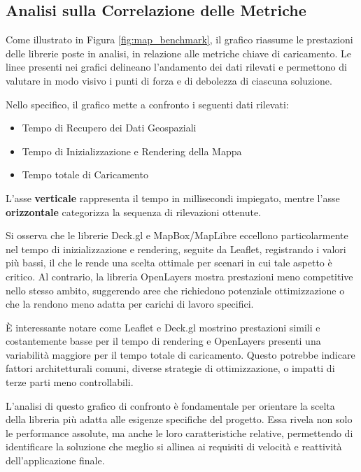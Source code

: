 \subsection{Analisi sulla Correlazione delle Metriche}


Come illustrato in Figura \ref{fig:map_benchmark}, il grafico riassume le prestazioni delle librerie poste in analisi, in relazione alle metriche chiave di caricamento. Le linee presenti nei grafici delineano l'andamento dei dati rilevati e permettono di valutare in modo visivo i punti di forza e di debolezza di ciascuna soluzione.

Nello specifico, il grafico mette a confronto i seguenti dati rilevati:
    \begin{itemize}
        \item Tempo di Recupero dei Dati Geospaziali
        \item Tempo di Inizializzazione e Rendering della Mappa
        \item Tempo totale di Caricamento
    \end{itemize}
    

L'asse \textbf{verticale} rappresenta il tempo in millisecondi impiegato, mentre l'asse \textbf{orizzontale} categorizza la sequenza di rilevazioni ottenute.

Si osserva che le librerie Deck.gl e MapBox/MapLibre eccellono particolarmente nel tempo di inizializzazione e rendering, seguite da Leaflet, registrando i valori più bassi, il che le rende una scelta ottimale per scenari in cui tale aspetto è critico. Al contrario, la libreria OpenLayers mostra prestazioni meno competitive nello stesso ambito, suggerendo aree che richiedono potenziale ottimizzazione o che la rendono meno adatta per carichi di lavoro specifici.

È interessante notare come Leaflet e Deck.gl mostrino prestazioni simili e costantemente basse per il tempo di rendering e OpenLayers presenti una variabilità maggiore per il tempo totale di caricamento. Questo potrebbe indicare fattori architetturali comuni, diverse strategie di ottimizzazione, o impatti di terze parti meno controllabili.

L'analisi di questo grafico di confronto è fondamentale per orientare la scelta della libreria più adatta alle esigenze specifiche del progetto. Essa rivela non solo le performance assolute, ma anche le loro caratteristiche relative, permettendo di identificare la soluzione che meglio si allinea ai requisiti di velocità e reattività dell'applicazione finale.

